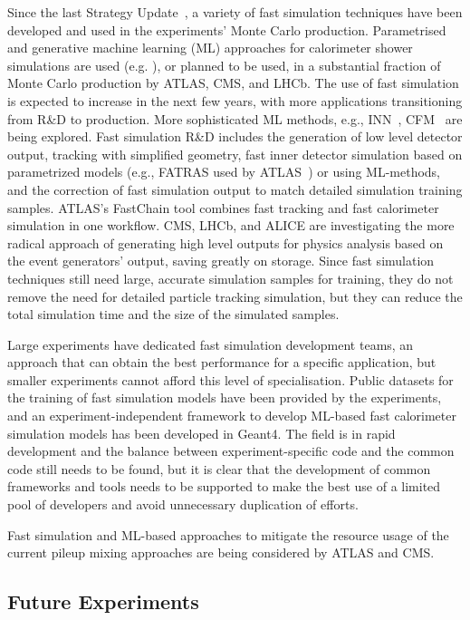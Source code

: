 \documentclass[10pt,a4paper]{article}
\begin{document}
Since the last Strategy Update~\cite{European:2720131}, a variety of fast simulation
techniques have been developed and used in the experiments' Monte Carlo
production. Parametrised and generative machine learning (ML) approaches for
calorimeter shower simulations are used (e.g. \cite{af3}), or planned to be
used, in a substantial fraction of Monte Carlo production by ATLAS, CMS, and
LHCb. The use of fast simulation is expected to increase in the next few years,
with more applications transitioning from R\&D to production. More sophisticated
ML methods, e.g., INN~\cite{kim2021innmethodidentifyingcleanannotated},
CFM~\cite{tong2024improvinggeneralizingflowbasedgenerative} are being explored.
Fast simulation R\&D includes the generation of low level detector output,
tracking with simplified geometry, fast inner detector simulation based on
parametrized models (e.g., FATRAS used by ATLAS~\cite{fatras}) or using
ML-methods, and the correction of fast simulation output to match detailed
simulation training samples. ATLAS's FastChain tool combines fast tracking and
fast calorimeter simulation in one workflow. CMS, LHCb, and ALICE are
investigating the more radical approach of generating high level outputs for
physics analysis based on the event generators' output, saving greatly on
storage. Since fast simulation techniques still need large, accurate simulation
samples for training, they do not remove the need for detailed particle tracking
simulation, but they can reduce the total simulation time and the size of the
simulated samples.

Large experiments have dedicated fast simulation development teams, an approach
that can obtain the best performance for a specific application, but smaller
experiments cannot afford this level of specialisation. Public datasets for the
training of fast simulation models have been provided by the experiments, and an
experiment-independent framework to develop ML-based fast calorimeter simulation
models has been developed in Geant4. The field is in rapid development and the
balance between experiment-specific code and the common code still needs to be
found, but it is clear that the development of common frameworks and tools needs
to be supported to make the best use of a limited pool of developers and avoid
unnecessary duplication of efforts.

Fast simulation and ML-based approaches to mitigate the resource usage
of the current pileup mixing approaches are being considered by ATLAS
and CMS.

\subsection{Future Experiments}\label{future-experiments}
\end{document}
